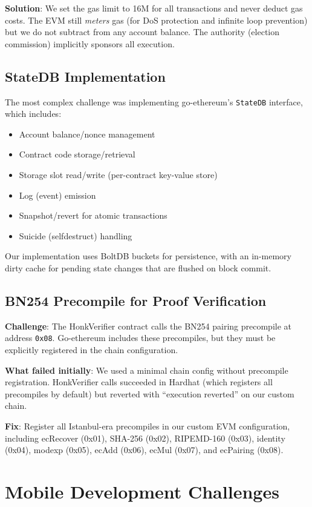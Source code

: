 \textbf{Solution}: We set the gas limit to 16M for all transactions and never deduct gas costs. The EVM still \textit{meters} gas (for DoS protection and infinite loop prevention) but we do not subtract from any account balance. The authority (election commission) implicitly sponsors all execution.

\subsection{StateDB Implementation}

The most complex challenge was implementing go-ethereum's \texttt{StateDB} interface, which includes:
\begin{itemize}
    \item Account balance/nonce management
    \item Contract code storage/retrieval
    \item Storage slot read/write (per-contract key-value store)
    \item Log (event) emission
    \item Snapshot/revert for atomic transactions
    \item Suicide (selfdestruct) handling
\end{itemize}

Our implementation uses BoltDB buckets for persistence, with an in-memory dirty cache for pending state changes that are flushed on block commit.

\subsection{BN254 Precompile for Proof Verification}

\textbf{Challenge}: The HonkVerifier contract calls the BN254 pairing precompile at address \texttt{0x08}. Go-ethereum includes these precompiles, but they must be explicitly registered in the chain configuration.

\textbf{What failed initially}: We used a minimal chain config without precompile registration. HonkVerifier calls succeeded in Hardhat (which registers all precompiles by default) but reverted with ``execution reverted'' on our custom chain.

\textbf{Fix}: Register all Istanbul-era precompiles in our custom EVM configuration, including ecRecover (0x01), SHA-256 (0x02), RIPEMD-160 (0x03), identity (0x04), modexp (0x05), ecAdd (0x06), ecMul (0x07), and ecPairing (0x08).

\section{Mobile Development Challenges}

